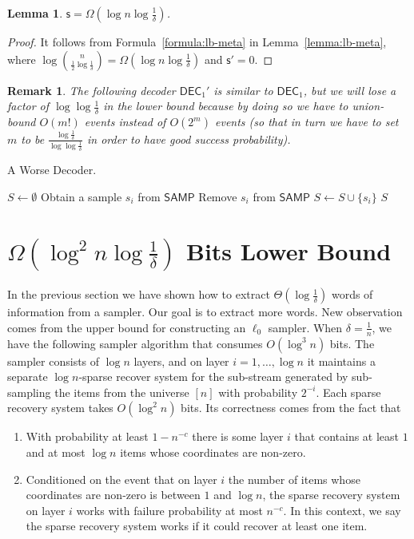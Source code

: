 \documentclass[10pt]{article}
\newtheorem{lemma}{Lemma}
\newtheorem{remark}{Remark}
\newcommand{\samp}{\textsf{SAMP}\xspace}
\newcommand{\dec}{\textsf{DEC}\xspace}
\newcommand{\s}{\textsf{s}\xspace}
\begin{document}
\begin{lemma}
  $\s = \Omega(\log n \log \frac{1}{\delta})$.
\end{lemma}

\begin{proof}
  It follows from Formula~\ref{formula:lb-meta} in Lemma~\ref{lemma:lb-meta}, where $\log {n \choose \frac{1}{2}\log \frac{1}{\delta}}=\Omega(\log n \log \frac{1}{\delta})$ and $\s'=0$. 
\end{proof}

\begin{remark}
  The following decoder $\dec_1'$ is similar to $\dec_1$, but we will lose a factor of $\log\log \frac{1}{\delta}$ in the lower bound because by doing so we have to union-bound $O(m!)$ events instead of $O(2^m)$ events (so that in turn we have to set $m$ to be $\frac{\log \frac{1}{\delta}}{\log\log\frac{1}{\delta}}$ in order to have good success probability). 
\end{remark}

\begin{algorithm}[H]
\caption{A Worse Decoder.}
\begin{algorithmic}[1]
\Procedure{$\dec_1'$}{\samp}
\State $S\leftarrow \emptyset$
\State Obtain a sample $s_i$ from $\samp$
\State Remove $s_i$ from $\samp$
\State $S \leftarrow S \cup \{s_i\}$
\EndFor
\State \Return $S$ 
\EndProcedure
\end{algorithmic}
\end{algorithm}


\section{$\Omega(\log^2 n \log \frac{1}{\delta})$ Bits Lower Bound} \label{sec:optimal-lb}

In the previous section we have shown how to extract $\Theta(\log \frac{1}{\delta})$ words of information from a sampler. 
Our goal is to extract more words. New observation comes from the upper bound for constructing an $\ell_0$ sampler. 
When $\delta=\frac{1}{n}$, we have the following sampler algorithm that consumes $O(\log^3 n)$ bits. 
The sampler consists of $\log n$ layers, and on layer $i=1,\ldots, \log n$ it maintains a separate $\log n$-sparse recover system for the sub-stream generated by sub-sampling the items from the universe $[n]$ with probability $2^{-i}$.
Each sparse recovery system takes $O(\log^2 n)$ bits. 
Its correctness comes from the fact that 
\begin{enumerate}
  \item With probability at least $1-n^{-c}$ there is some layer $i$ that contains at least $1$ and at most $\log n$ items whose coordinates are non-zero. 
  \item Conditioned on the event that on layer $i$ the number of items whose coordinates are non-zero is between $1$ and $\log n$, the sparse recovery system on layer $i$ works with failure probability at most $n^{-c}$. In this context, we say the sparse recovery system works if it could recover at least one item. 
\end{enumerate}
\end{document}
